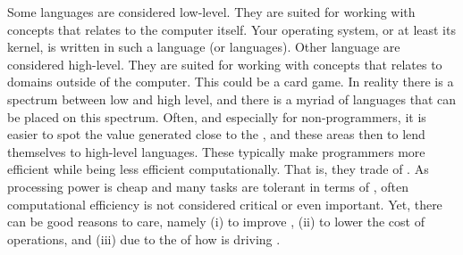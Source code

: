 Some languages are considered low-level. They are suited for working with concepts that relates to the computer itself. Your operating system, or at least its kernel, is written in such a language (or languages). Other language are considered high-level. They are suited for working with concepts that relates to domains outside of the computer. This could be a card game. In reality there is a spectrum between low and high level, and there is a myriad of languages that can be placed on this spectrum. Often, and especially for non-programmers, it is easier to spot the value generated close to the , and these areas then to lend themselves to high-level languages. These typically make programmers more efficient while being less efficient computationally. That is, they trade  of . As processing power is cheap and many tasks are tolerant in terms of , often computational efficiency is not considered critical or even important. Yet, there can be good reasons to care, namely (i) to improve , (ii) to lower the cost of operations, and (iii) due to the  of how  is driving .

